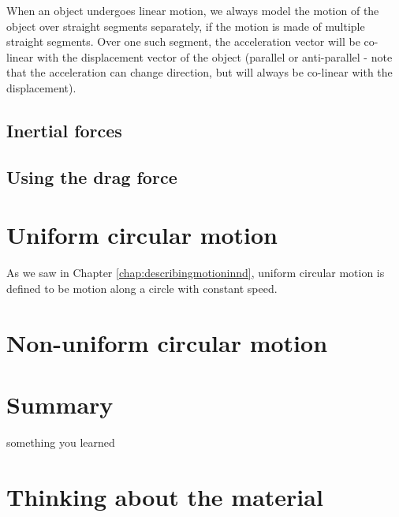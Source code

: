 When an object undergoes linear motion, we always model the motion of the object over straight segments separately, if the motion is made of multiple straight segments. Over one such segment, the acceleration vector will be co-linear with the displacement vector of the object (parallel or anti-parallel - note that the acceleration can change direction, but will always be co-linear with the displacement).



\subsection{}

\subsection{Inertial forces}

\subsection{Using the drag force}


\section{Uniform circular motion}
As we saw in Chapter \ref{chap:describingmotioninnd}, uniform circular motion is defined to be motion along a circle with constant speed. 

\section{Non-uniform circular motion}











\newpage
\section{Summary}
\vspace{1cm}
\begin{chapterSummary}
\item something you learned
\end{chapterSummary}


\section{Thinking about the material}


